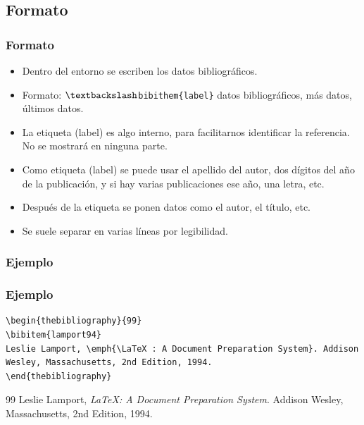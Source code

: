 \documentclass[aspectratio=1610]{beamer}%
\begin{document}
\subsection{Formato}
\begin{frame}[fragile]
\frametitle{\textbf{Formato}}
\justifying
 \begin{itemize}\justifying
  \item Dentro del entorno se escriben los datos bibliográficos.
  \item Formato: \texttt{$\textbackslash$bibithem\{label\}} datos bibliográficos, más datos, últimos datos.
  \item La etiqueta (label) es algo interno, para facilitarnos identificar la referencia. No se mostrará en ninguna parte.
  \item Como etiqueta (label) se puede usar el apellido del autor, dos dígitos del año de la publicación, y si hay varias publicaciones ese año, una letra, etc.
  \item Después de la etiqueta se ponen datos como el autor, el título, etc.
  \item Se suele separar en varias líneas por legibilidad.
\end{itemize}

\end{frame}

\subsubsection{Ejemplo}
\begin{frame}[fragile]
\frametitle{\textbf{Ejemplo}}
\justifying
 \begin{exampleblock}{}
   \vspace{-0.7cm}
\begin{lstlisting}
\begin{thebibliography}{99}
\bibitem{lamport94}
Leslie Lamport, \emph{\LaTeX : A Document Preparation System}. Addison Wesley, Massachusetts, 2nd Edition, 1994.
\end{thebibliography}
\end{lstlisting}\vspace{-0.3cm}

\end{exampleblock}

\begin{block}{}
\begin{thebibliography}{99}
 Leslie Lamport, \emph{\LaTeX : A Document Preparation System}. Addison Wesley, Massachusetts, 2nd Edition, 1994.
\end{thebibliography}
\end{block}


\end{frame}
\end{document}

